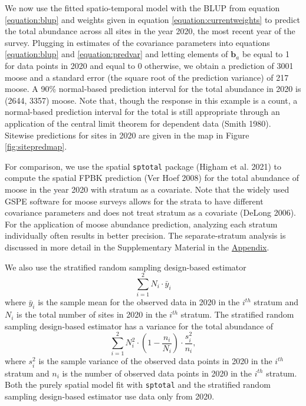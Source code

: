 \documentclass[]{article}    %
\begin{document}
We now use the fitted spatio-temporal model with the BLUP from equation
\ref{equation:blup} and weights given in equation
\ref{equation:currentweights} to predict the total abundance across all
sites in the year 2020, the most recent year of the survey. Plugging in
estimates of the covariance parameters into equations
\ref{equation:blup} and \ref{equation:predvar} and letting elements of
\(\mathbf{b}_a\) be equal to 1 for data points in 2020 and equal to 0
otherwise, we obtain a prediction of 3001 moose and a standard error
(the square root of the prediction variance) of 217 moose. A 90\%
normal-based prediction interval for the total abundance in 2020 is
(2644, 3357) moose. Note that, though the response in this example is a
count, a normal-based prediction interval for the total is still
appropriate through an application of the central limit theorem for
dependent data (Smith 1980). Sitewise predictions for sites in 2020 are
given in the map in Figure \ref{fig:sitepredmap}.

For comparison, we use the spatial \texttt{sptotal} package (Higham et
al. 2021) to compute the spatial FPBK prediction (Ver Hoef 2008) for the
total abundance of moose in the year 2020 with stratum as a covariate.
Note that the widely used GSPE software for moose surveys allows for the
strata to have different covariance parameters and does not treat
stratum as a covariate (DeLong 2006). For the application of moose
abundance prediction, analyzing each stratum individually often results
in better precision. The separate-stratum analysis is discussed in more
detail in the Supplementary Material in the
\protect\hyperlink{appendix}{Appendix}.

We also use the stratified random sampling design-based estimator
\mbox{} \begin{equation*}
\sum_{i = 1}^{2} N_i \cdot \bar{y}_i
\end{equation*} \noindent where \(\bar{y}_i\) is the sample mean for the
observed data in 2020 in the \(i^{th}\) stratum and \(N_i\) is the total
number of sites in 2020 in the \(i^{th}\) stratum. The stratified random
sampling design-based estimator has a variance for the total abundance
of \mbox{} \begin{equation*}
\sum_{i = 1}^{2} N_i^2 \cdot \left(1 - \frac{n_i}{N_i}\right) \cdot \frac{s^2_i}{n_i},
\end{equation*} \noindent where \(s^2_i\) is the sample variance of the
observed data points in 2020 in the \(i^{th}\) stratum and \(n_i\) is
the number of observed data points in 2020 in the \(i^{th}\) stratum.
Both the purely spatial model fit with \texttt{sptotal} and the
stratified random sampling design-based estimator use data only from
2020.
\end{document}

